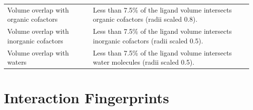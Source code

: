 \begin{longtable}[]{@{}
  >{\raggedright\arraybackslash}p{}
  >{\raggedright\arraybackslash}p{}@{}}
Volume overlap with organic cofactors & Less than 7.5\% of the ligand volume intersects organic cofactors (radii scaled 0.8). \\
Volume overlap with inorganic cofactors & Less than 7.5\% of the ligand volume intersects inorganic cofactors (radii scaled 0.5). \\
Volume overlap with waters & Less than 7.5\% of the ligand volume intersects water molecules (radii scaled 0.5). \\
\end{longtable}

\hypertarget{interaction-fingerprints}{%
\section{Interaction Fingerprints}\label{interaction-fingerprints}}

